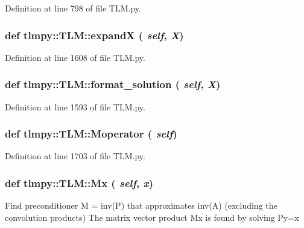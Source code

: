 Definition at line 798 of file TLM.py.\hypertarget{namespacetlmpy_1_1TLM_a37c4928c27b9fa2b93ef82e3a821d0d2}{
\subsubsection[{expandX}]{\setlength{\rightskip}{0pt plus 5cm}def tlmpy::TLM::expandX ( {\em self}, \/   {\em X})}}
\label{namespacetlmpy_1_1TLM_a37c4928c27b9fa2b93ef82e3a821d0d2}


Definition at line 1608 of file TLM.py.\hypertarget{namespacetlmpy_1_1TLM_abdd135d6b78ddffa8145289a1a4f34d7}{
\subsubsection[{format\_\-solution}]{\setlength{\rightskip}{0pt plus 5cm}def tlmpy::TLM::format\_\-solution ( {\em self}, \/   {\em X})}}
\label{namespacetlmpy_1_1TLM_abdd135d6b78ddffa8145289a1a4f34d7}


Definition at line 1593 of file TLM.py.\hypertarget{namespacetlmpy_1_1TLM_a40148bfa7778993b9c53585a057069a2}{
\subsubsection[{Moperator}]{\setlength{\rightskip}{0pt plus 5cm}def tlmpy::TLM::Moperator ( {\em self})}}
\label{namespacetlmpy_1_1TLM_a40148bfa7778993b9c53585a057069a2}


Definition at line 1703 of file TLM.py.\hypertarget{namespacetlmpy_1_1TLM_a1c9a95ddc740eb1cfe8cd40789406031}{
\subsubsection[{Mx}]{\setlength{\rightskip}{0pt plus 5cm}def tlmpy::TLM::Mx ( {\em self}, \/   {\em x})}}
\label{namespacetlmpy_1_1TLM_a1c9a95ddc740eb1cfe8cd40789406031}
\begin{DoxyVerb}
Find preconditioner M = inv(P) that approximates inv(A)
(excluding the convolution products)
The matrix vector product Mx is found by solving Py=x
\end{DoxyVerb}
 

